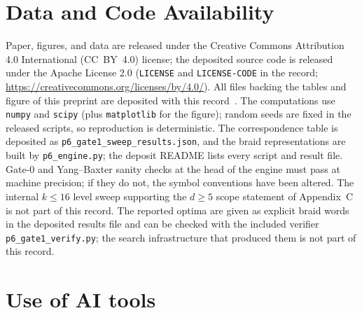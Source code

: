 \documentclass[aps,prx,reprint,amsmath,amssymb,floatfix,nofootinbib,superscriptaddress]{revtex4-2}
\begin{document}
\section*{Data and Code Availability}
\label{sec:code}

Paper, figures, and data are released under the Creative Commons Attribution 4.0
International (CC~BY~4.0) license; the deposited source code is released under the
Apache License 2.0
(\texttt{LICENSE} and \texttt{LICENSE-CODE} in the record;
\url{https://creativecommons.org/licenses/by/4.0/}). All files backing the
tables and figure of this preprint are deposited with this
record~\cite{Sayim2026P4data}. The computations use
\texttt{numpy} and \texttt{scipy} (plus \texttt{matplotlib} for the figure); random seeds are fixed
in the released scripts, so reproduction is deterministic. The correspondence table is
deposited as \texttt{p6\_gate1\_sweep\_results.json}, and the braid representations are built
by \texttt{p6\_engine.py}; the deposit README lists every script and result file.
Gate-$0$ and Yang--Baxter
sanity checks at the head of the engine must pass at machine precision; if they do
not, the symbol conventions have been altered. The internal $k \le 16$ level sweep
supporting the $d \ge 5$ scope statement of Appendix~C is not part of this record. The
reported optima are given as explicit braid words in the deposited results file and can
be checked with the included verifier \texttt{p6\_gate1\_verify.py}; the search
infrastructure that produced them is not part of this record.

\section*{Use of AI tools}
\end{document}
